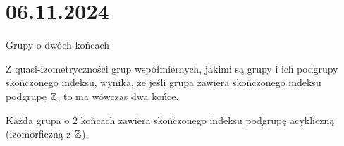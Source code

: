 \section{06.11.2024}{Grupy o dwóch końcach}

Z quasi-izometryczności grup współmiernych, jakimi są grupy i ich podgrupy skończonego indeksu, wynika, że jeśli grupa zawiera skończonego indeksu podgrupę $\mathbb{Z}$, to ma wówczas dwa końce.

\begin{theorem}{}{}
  Każda grupa o $2$ końcach zawiera skończonego indeksu podgrupę acykliczną (izomorficzną z $\mathbb{Z}$).
\end{theorem}
